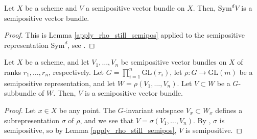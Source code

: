 \begin{lemma}\label{symd_semipos}
Let $X$ be a scheme and $V$ a semipositive vector bundle on $X$. 
Then, $\mathrm{Sym}^dV$ is a semipositive vector bundle.
\end{lemma}
\begin{proof}
This is Lemma \ref{apply_rho_still_semipos} applied to the semipositive representation $\mathrm{Sym}^d$, see .
\end{proof}


\begin{lemma}
Let $X$ be a scheme, and let $V_1,\ldots,V_n$ be semipositive vector bundles on $X$ of ranks $r_1,\ldots,r_n$, respectively. 
Let $G=\prod_{i=1}^{n}\mathrm{GL}(r_i)$, let $\rho:G\to \mathrm{GL}(m)$ be a semipositive representation, and let $W=\rho(V_1,\ldots,V_n)$.
Let $V\subset W$ be a $G$-subbundle of $W$. 
Then, $V$ is a semipositive vector bundle.
\end{lemma}

\begin{proof}
Let $x\in X$ be any point.
The $G$-invariant subspace $V_x\subset W_x$ defines a subrepresentation $\sigma$ of $\rho$, and we see that $V=\sigma(V_1,\ldots,V_n)$.
By , $\sigma$ is semipositive, so by Lemma \ref{apply_rho_still_semipos}, $V$ is semipositive.
\end{proof}







